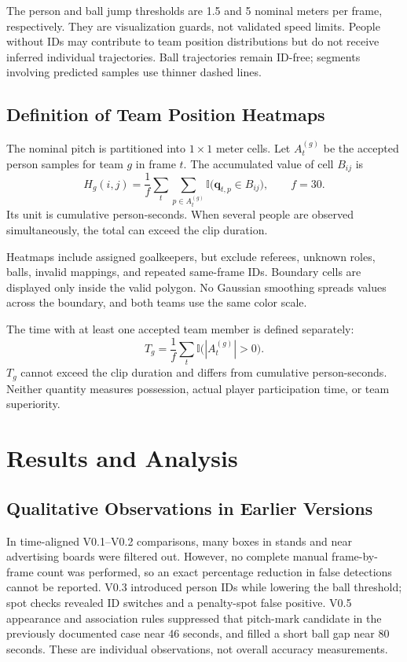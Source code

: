 \documentclass[11pt,a4paper]{article}
\begin{document}
The person and ball jump thresholds are 1.5 and 5 nominal meters per frame,
respectively. They are visualization guards, not validated speed limits.
People without IDs may contribute to team position distributions but do not
receive inferred individual trajectories. Ball trajectories remain ID-free;
segments involving predicted samples use thinner dashed lines.

\subsection{Definition of Team Position Heatmaps}

The nominal pitch is partitioned into $1\times1$ meter cells.
Let $A_t^{(g)}$ be the accepted person samples for team $g$ in frame $t$.
The accumulated value of cell $B_{ij}$ is
\begin{equation}
 H_g(i,j)=\frac1f\sum_t\sum_{p\in A_t^{(g)}}
           \mathbb{I}\bigl(\mathbf{q}_{t,p}\in B_{ij}\bigr),
 \qquad f=30.
\end{equation}
Its unit is cumulative person-seconds. When several people are observed
simultaneously, the total can exceed the clip duration.

Heatmaps include assigned goalkeepers, but exclude referees, unknown roles,
balls, invalid mappings, and repeated same-frame IDs.
Boundary cells are displayed only inside the valid polygon.
No Gaussian smoothing spreads values across the boundary, and both teams use
the same color scale.

The time with at least one accepted team member is defined separately:
\begin{equation}
 T_g=\frac1f\sum_t\mathbb{I}\bigl(|A_t^{(g)}|>0\bigr).
\end{equation}
$T_g$ cannot exceed the clip duration and differs from cumulative person-seconds.
Neither quantity measures possession, actual player participation time,
or team superiority.

\section{Results and Analysis}

\subsection{Qualitative Observations in Earlier Versions}

In time-aligned V0.1--V0.2 comparisons, many boxes in stands and near advertising
boards were filtered out. However, no complete manual frame-by-frame count
was performed, so an exact percentage reduction in false detections cannot be
reported. V0.3 introduced person IDs while lowering the ball threshold; spot
checks revealed ID switches and a penalty-spot false positive.
V0.5 appearance and association rules suppressed that pitch-mark candidate
in the previously documented case near 46 seconds, and filled a short ball gap
near 80 seconds. These are individual observations, not overall accuracy
measurements.
\end{document}
